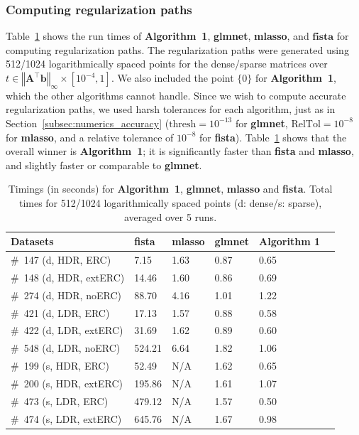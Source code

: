 \documentclass[11pt]{article}
\numberwithin{prop}{section}
\numberwithin{lem}{section}
\numberwithin{rem}{section}
\numberwithin{cor}{section}
\numberwithin{thm}{section}
\numberwithin{defn}{section}
\numberwithin{fact}{section}
\theoremstyle{plain}
\def\bb {\boldsymbol{b}}
\newcommand{\norminf}[1]{\left\Vert{#1} \right\Vert_{\infty}}
\newcommand{\matr}[1]{\bm{#1}}
\def\Atop {\matr{A}^{\top}}
\begin{document}
\subsubsection{Computing regularization paths}
Table~\ref{tab:timings} shows the run times of \textbf{Algorithm~1}, \textbf{glmnet}, \textbf{mlasso}, and $\textbf{fista}$ for computing regularization paths. The regularization paths were generated using 512/1024 logarithmically spaced points for the dense/sparse matrices over $t \in \norminf{\Atop\bb} \times [10^{-4},1]$. We also included the point $\{0\}$ for \textbf{Algorithm~1}, which the other algorithms cannot handle. Since we wish to compute accurate regularization paths, we used harsh tolerances for each algorithm, just as in Section~\ref{subsec:numerics_accuracy} ($\text{thresh} = 10^{-13}$ for \textbf{glmnet}, $\text{RelTol} = 10^{-8}$ for \textbf{mlasso}, and a relative tolerance of $10^{-8}$ for \textbf{fista}). Table~\ref{tab:timings} shows that the overall winner is \textbf{Algorithm~1}; it is significantly faster than \textbf{fista} and \textbf{mlasso}, and slightly faster or comparable to \textbf{glmnet}.

\begin{table}[ht]
    \centering
    \begin{tabular}{|l|l|l|l|l|l}
    \hline
        Datasets & \textbf{fista} & \textbf{mlasso} & \textbf{glmnet} & \textbf{Algorithm 1}\\
        \hline
        \#~147 (d, HDR, ERC) & 7.15 & 1.63 & 0.87 & 0.65\\
        \hline
        \#~148 (d, HDR, extERC) & 14.46 & 1.60 & 0.86 & 0.69\\
        \hline
        \#~274 (d, HDR, noERC) & 88.70 & 4.16 & 1.01 & 1.22\\
        \hline
        \#~421 (d, LDR, ERC) & 17.13 & 1.57 & 0.88 & 0.58\\
        \hline
        \#~422 (d, LDR, extERC) & 31.69 & 1.62 & 0.89 & 0.60\\
        \hline
        \#~548 (d, LDR, noERC) & 524.21 & 6.64 & 1.82 & 1.06\\
        \hline
        \#~199 (s, HDR, ERC) & 52.49 & N/A & 1.62 & 0.65\\
        \hline
        \#~200 (s, HDR, extERC) & 195.86 & N/A & 1.61 & 1.07\\
        \hline
        \#~473 (s, LDR, ERC) & 479.12 & N/A & 1.57 & 0.50\\
        \hline
        \#~474 (s, LDR, extERC) & 645.76 & N/A & 1.67 & 0.98\\
        \hline
    \end{tabular}
    \caption{Timings (in seconds) for \textbf{Algorithm~1}, \textbf{glmnet}, \textbf{mlasso} and \textbf{fista}. Total times for 512/1024 logarithmically spaced points (d: dense/s: sparse), averaged over 5 runs. \label{tab:timings}}
\end{table}
\end{document}
